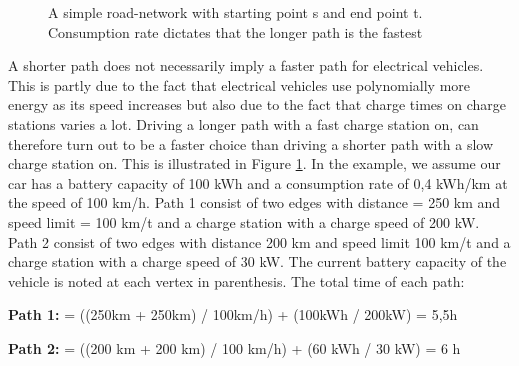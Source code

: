 \begin{figure}
\label{fig:simpleroad-network}
\caption{A simple road-network with starting point s and end point t. Consumption rate dictates that the longer path is the fastest}
\end{figure}

A shorter path does not necessarily imply a faster path for electrical vehicles. This is partly due to the fact that electrical vehicles use polynomially more energy as its speed increases but also due to the fact that charge times on charge stations varies a lot. 
Driving a longer path with a fast charge station on, can therefore turn out to be a faster choice than driving a shorter path with a slow charge station on. This is illustrated in Figure \ref{fig:simpleroad-network}. In the example, we assume our car has a battery capacity of 100 kWh and a consumption rate of 0,4 kWh/km at the speed of 100 km/h. Path 1 consist of two edges with distance = 250 km and speed limit = 100 km/t
and a charge station with a charge speed of 200 kW. Path 2 consist of two edges with
distance 200 km and speed limit 100 km/t and a charge station with a charge speed of 30 kW. The current battery capacity of the vehicle is noted at each vertex in parenthesis. The total time of each path:
				
\textbf{Path 1:}  = ((250km + 250km) / 100km/h) + (100kWh / 200kW) = 5,5h
				
\textbf{Path 2:}  = ((200 km + 200 km) / 100 km/h) + (60 kWh / 30 kW) = 6 h

